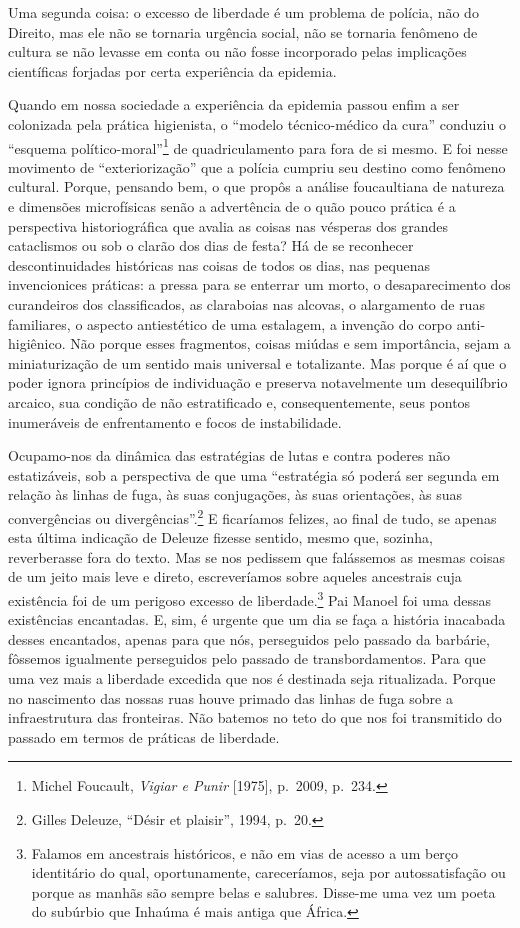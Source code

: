 Uma segunda coisa: o excesso de liberdade é um problema de polícia, não
do Direito, mas ele não se tornaria urgência social, não se tornaria
fenômeno de cultura se não levasse em conta ou não fosse incorporado
pelas implicações científicas forjadas por certa experiência da
epidemia.

Quando em nossa sociedade a experiência da epidemia passou enfim a ser
colonizada pela prática higienista, o ``modelo técnico-médico da cura''
conduziu o ``esquema político-moral''\footnote{Michel Foucault,
  \textit{Vigiar e Punir} {[}1975{]}, p.~2009, p.~234.} de quadriculamento
para fora de si mesmo. E foi nesse movimento de ``exteriorização'' que a
polícia cumpriu seu destino como fenômeno cultural. Porque, pensando
bem, o que propôs a análise foucaultiana de natureza e dimensões
microfísicas senão a advertência de o quão pouco prática é a perspectiva
historiográfica que avalia as coisas nas vésperas dos grandes
cataclismos ou sob o clarão dos dias de festa? Há de se reconhecer
descontinuidades históricas nas coisas de todos os dias, nas pequenas
invencionices práticas: a pressa para se enterrar um morto, o
desaparecimento dos curandeiros dos classificados, as claraboias nas
alcovas, o alargamento de ruas familiares, o aspecto antiestético de uma
estalagem, a invenção do corpo anti-higiênico. Não porque esses
fragmentos, coisas miúdas e sem importância, sejam a miniaturização de
um sentido mais universal e totalizante. Mas porque é aí que o poder
ignora princípios de individuação e preserva notavelmente um
desequilíbrio arcaico, sua condição de não estratificado e,
consequentemente, seus pontos inumeráveis de enfrentamento e focos de
instabilidade.

Ocupamo-nos da dinâmica das estratégias de lutas e contra poderes não
estatizáveis, sob a perspectiva de que uma ``estratégia só poderá ser
segunda em relação às linhas de fuga, às suas conjugações, às suas
orientações, às suas convergências ou divergências''.\footnote{Gilles
  Deleuze, ``Désir et plaisir'', 1994, p.~20.} E ficaríamos felizes, ao
final de tudo, se apenas esta última indicação de Deleuze fizesse
sentido, mesmo que, sozinha, reverberasse fora do texto. Mas se nos
pedissem que falássemos as mesmas coisas de um jeito mais leve e direto,
escreveríamos sobre aqueles ancestrais cuja existência foi de um
perigoso excesso de liberdade.\footnote{Falamos em ancestrais
  históricos, e não em vias de acesso a um berço identitário do qual,
  oportunamente, careceríamos, seja por autossatisfação ou porque as
  manhãs são sempre belas e salubres. Disse-me uma vez um poeta do
  subúrbio que Inhaúma é mais antiga que África.} Pai Manoel foi uma
dessas existências encantadas. E, sim, é urgente que um dia se faça a
história inacabada desses encantados, apenas para que nós, perseguidos
pelo passado da barbárie, fôssemos igualmente perseguidos pelo passado
de transbordamentos. Para que uma vez mais a liberdade excedida que nos
é destinada seja ritualizada. Porque no nascimento das nossas ruas houve
primado das linhas de fuga sobre a infraestrutura das fronteiras. Não
batemos no teto do que nos foi transmitido do passado em termos de
práticas de liberdade.

